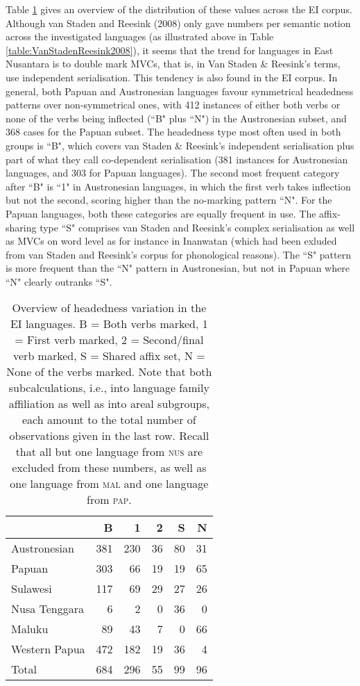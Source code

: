 Table \ref{table:Headedness_overview} gives an overview of the distribution of these values across the EI corpus. Although van Staden and Reesink (2008) only gave numbers per semantic notion across the investigated languages (as illustrated above in Table \ref{table:VanStadenReesink2008}), it seems that the trend for languages in East Nusantara is to double mark MVCs, that is, in Van Staden \& Reesink's terms, use independent serialisation. This tendency is also found in the EI corpus. In general, both Papuan and Austronesian languages favour symmetrical headedness patterns over non-symmetrical ones, with 412 instances of either both verbs or none of the verbs being inflected (``B" plus ``N") in the Austronesian subset, and 368 cases for the Papuan subset. The headedness type most often used in both groups is ``B", which covers van Staden \& Reesink's independent serialisation plus part of what they call co-dependent serialisation (381 instances for Austronesian languages, and 303 for Papuan languages). The second most frequent category after ``B" is ``1" in Austronesian languages, in which the first verb takes inflection but not the second, scoring higher than the no-marking pattern ``N". For the Papuan languages, both these categories are equally frequent in use. The affix-sharing type ``S" comprises van Staden and Reesink's complex serialisation as well as MVCs on word level as for instance in Inanwatan (which had been exluded from van Staden and Reesink's corpus for phonological reasons). The ``S" pattern is more frequent than the ``N" pattern in Austronesian, but not in Papuan where ``N" clearly outranks ``S".

\begin{table}


\begin{tabular}{lrrrrr}
  \hline\hline
 & B & 1 & 2 & S & N \tabularnewline 
  \hline
  Austronesian & 381 & 230 &  36 &  80 & 31 \tabularnewline
  Papuan & 303 & 66 &  19 &  19 & 65 \tabularnewline
   \hline
  Sulawesi & 117 &  69 &  29 &  27 &  26 \tabularnewline
  Nusa Tenggara & 6 & 2 &  0 &  36 & 0 \tabularnewline
  Maluku & 89 &  43 &   7 &   0 &   66 \tabularnewline 
  Western Papua & 472 & 182 &  19 &  36 &  4 \tabularnewline 
\hline\hline
Total & 684 & 296 & 55 & 99 & 96 \tabularnewline
\hline
\end{tabular}
\caption[Headedness variation in the EI corpus]{Overview of headedness variation in the EI languages. B = Both verbs marked, 1 = First verb marked, 2 = Second/final verb marked, S = Shared affix set, N = None of the verbs marked. Note that both subcalculations, i.e., into language family affiliation as well as into areal subgroups, each amount to the total number of observations given in the last row. Recall that all but one language from \textsc{nus} are excluded from these numbers, as well as one language from \textsc{mal} and one language from \textsc{pap}.}
\label{table:Headedness_overview}


\end{table}


